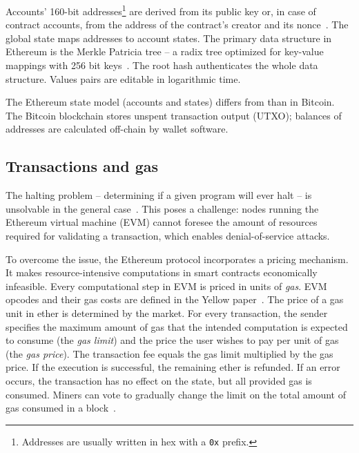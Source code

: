Accounts' 160-bit addresses\footnote{Addresses are usually written in hex with a \texttt{0x} prefix.} are derived from its public key or, in case of contract accounts, from the address of the contract's creator and its nonce~\cite{EthereumSE16}.
The global state maps addresses to account states.
The primary data structure in Ethereum is the Merkle Patricia tree -- a radix tree optimized for key-value mappings with 256 bit keys~\cite{MPTSpec, Buchman14}.
The root hash authenticates the whole data structure.
Values pairs are editable in logarithmic time.

The Ethereum state model (accounts and states) differs from than in Bitcoin.
The Bitcoin blockchain stores unspent transaction output (UTXO); balances of addresses are calculated off-chain by wallet software.


\subsection{Transactions and gas}

The halting problem -- determining if a given program will ever halt -- is unsolvable in the general case~\cite{Church1936}.
This poses a challenge: nodes running the Ethereum virtual machine (EVM) cannot foresee the amount of resources required for validating a transaction, which enables denial-of-service attacks.

To overcome the issue, the Ethereum protocol incorporates a pricing mechanism.
It makes resource-intensive computations in smart contracts economically infeasible.
Every computational step in EVM is priced in units of \emph{gas}.
EVM opcodes and their gas costs are defined in the Yellow paper~\cite{Wood2014}.
The price of a gas unit in ether is determined by the market.
For every transaction, the sender specifies the maximum amount of gas that the intended computation is expected to consume (the \emph{gas limit}) and the price the user wishes to pay per unit of gas (the \emph{gas price}).
The transaction fee equals the gas limit multiplied by the gas price.
If the execution is successful, the remaining ether is refunded.
If an error occurs, the transaction has no effect on the state, but all provided gas is consumed.
Miners can vote to gradually change the limit on the total amount of gas consumed in a block~\cite{Jnnk15}.

